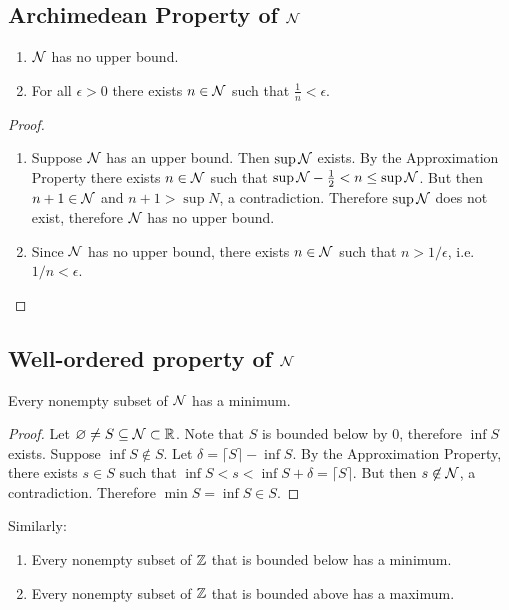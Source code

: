 \subsection{Archimedean Property of $\mathcal{N}$}
\begin{theorem*}\hspace{0pt}
  \begin{enumerate}
  \item $\mathcal{N}$ has no upper bound.
  \item For all $\epsilon > 0$ there exists $n \in \mathcal{N}$ such that $\frac{1}{n} < \epsilon$.
  \end{enumerate}
\end{theorem*}
\begin{proof}\hspace{0pt}
  \begin{enumerate}
  \item Suppose $\mathcal{N}$ has an upper bound. Then $\sup \mathcal{N}$ exists. By the Approximation Property
    there exists $n \in \mathcal{N}$ such that $\sup \mathcal{N} - \frac{1}{2} < n \leq \sup \mathcal{N}$. But then
    $n + 1 \in \mathcal{N}$ and $n + 1 > \sup N$, a contradiction. Therefore $\sup \mathcal{N}$ does not exist,
    therefore $\mathcal{N}$ has no upper bound.
  \item Since $\mathcal{N}$ has no upper bound, there exists $n \in \mathcal{N}$ such that $n > 1/\epsilon$,
    i.e. $1/n < \epsilon$.
  \end{enumerate}
\end{proof}

\subsection{Well-ordered property of $\mathcal{N}$}
\begin{theorem*}\hspace{0pt}
  Every nonempty subset of $\mathcal{N}$ has a minimum.
\end{theorem*}

\begin{proof}
  Let $\varnothing \neq S \subseteq \mathcal{N} \subset \mathbb{R}$. Note that $S$ is bounded below by 0, therefore
  $\inf S$ exists. Suppose $\inf S \not\in S$. Let $\delta = \lceil S \rceil - \inf S$. By the
  Approximation Property, there exists $s \in S$ such that
  $\inf S < s < \inf S + \delta = \lceil S \rceil$. But then $s \not\in \mathcal{N}$, a
  contradiction. Therefore $\min S = \inf S \in S$.
\end{proof}

\begin{remark*}
  Similarly:
  \begin{enumerate}
    \item Every nonempty subset of $\mathbb{Z}$ that is bounded below has a minimum.
    \item Every nonempty subset of $\mathbb{Z}$ that is bounded above has a maximum.
  \end{enumerate}
\end{remark*}

